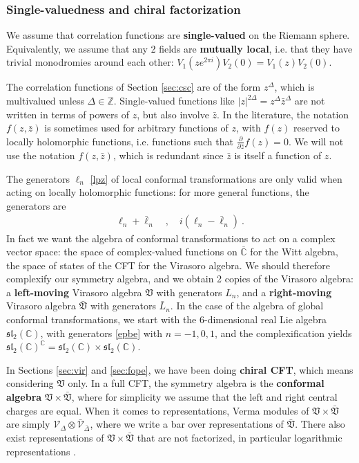 \documentclass[12pt, a4paper]{article}
\newcommand{\myindex}[1]{\textbf{\boldmath #1}}
\theoremstyle{break}
\begin{document}
\subsubsection{Single-valuedness and chiral factorization}

We assume that correlation functions are \myindex{single-valued} on the Riemann sphere. Equivalently, we assume that any 2 fields are \myindex{mutually local}, i.e. that they have trivial monodromies around each other: $V_1(ze^{2\pi i})V_2(0)=V_1(z)V_2(0)$. 

The correlation functions of Section \ref{sec:csc} are of the form $z^\Delta$, which is multivalued unless $\Delta\in\mathbb{Z}$. Single-valued functions like $|z|^{2\Delta}=z^\Delta\bar{z}^\Delta$ are not written in terms of powers of $z$, but also involve $\bar z$. In the literature, the notation $f(z,\bar z)$ is sometimes used for arbitrary functions of $z$, with $f(z)$ reserved to locally holomorphic functions, i.e. functions such that $\frac{\partial}{\partial \bar z} f(z) =0$. We will not use the notation $f(z,\bar z)$, which is redundant since $\bar z$ is itself a function of $z$. 

The generators $\ell_n$ \eqref{lpz} of local conformal transformations are only valid when acting on locally holomorphic functions: for more general functions, the generators are 
\begin{align}
 \ell_n +\bar{\ell}_n \quad , \quad i(\ell_n -\bar \ell_n)\  .
 \label{epbe}
\end{align}
In fact we want the algebra of conformal transformations to act on a complex vector space: the space of complex-valued functions on $\overline{\mathbb{C}}$ for the Witt algebra, the space of states of the CFT for the Virasoro algebra. We should therefore complexify our symmetry algebra, and we obtain 2 copies of the Virasoro algebra: a \myindex{left-moving}  Virasoro algebra $\mathfrak{V}$ with generators $L_n$, and a \myindex{right-moving} Virasoro algebra $\bar{\mathfrak{V}}$ with generators $\bar{L}_n$. In the case of the algebra of global conformal transformations, we start with the 6-dimensional real Lie algebra $\mathfrak{sl}_2(\mathbb{C})$, with generators \eqref{epbe} with $n=-1,0,1$, and the complexification yields $\mathfrak{sl}_2(\mathbb{C})^\mathbb{C} = \mathfrak{sl}_2(\mathbb{C})\times \mathfrak{sl}_2(\mathbb{C})$.

In Sections \ref{sec:vir} and \ref{sec:fope}, we have been doing \myindex{chiral CFT}, which means considering $\mathfrak{V}$ only. In a full CFT, the symmetry algebra is the \myindex{conformal algebra} $\mathfrak{V}\times \bar{\mathfrak{V}}$, where for simplicity we assume that the left and right central charges are equal. When it comes to representations, Verma modules of $\mathfrak{V}\times \bar{\mathfrak{V}}$ are simply $\mathcal{V}_\Delta\otimes \bar{\mathcal{V}}_{\bar \Delta}$, where we write a bar over representations of $\bar{\mathfrak{V}}$. There also exist representations of $\mathfrak{V}\times \bar{\mathfrak{V}}$ that are not factorized, in particular logarithmic representations \cite{nr20}. 
\end{document}
